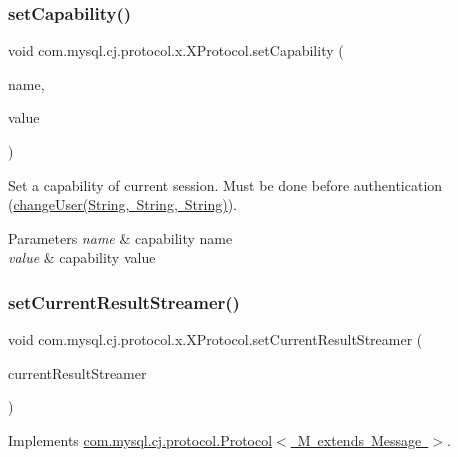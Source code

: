 \subsubsection{\texorpdfstring{set\+Capability()}{setCapability()}}
{\footnotesize\ttfamily void com.\+mysql.\+cj.\+protocol.\+x.\+X\+Protocol.\+set\+Capability (\begin{DoxyParamCaption}\item[{String}]{name,  }\item[{Object}]{value }\end{DoxyParamCaption})}

Set a capability of current session. Must be done before authentication (\mbox{\hyperlink{classcom_1_1mysql_1_1cj_1_1protocol_1_1x_1_1_x_protocol_ada78c49db272f6f4a680c7d552f5be86}{change\+User(\+String, String, String)}}).


\begin{DoxyParams}{Parameters}
{\em name} & capability name \\
\hline
{\em value} & capability value \\
\hline
\end{DoxyParams}
\mbox{\label{classcom_1_1mysql_1_1cj_1_1protocol_1_1x_1_1_x_protocol_a5d594bb0ea3ed519640a02cbdd74a165}} 
\subsubsection{\texorpdfstring{set\+Current\+Result\+Streamer()}{setCurrentResultStreamer()}}
{\footnotesize\ttfamily void com.\+mysql.\+cj.\+protocol.\+x.\+X\+Protocol.\+set\+Current\+Result\+Streamer (\begin{DoxyParamCaption}\item[{\mbox{\hyperlink{interfacecom_1_1mysql_1_1cj_1_1protocol_1_1_result_streamer}{Result\+Streamer}}}]{current\+Result\+Streamer }\end{DoxyParamCaption})}



Implements \mbox{\hyperlink{interfacecom_1_1mysql_1_1cj_1_1protocol_1_1_protocol_a3923a0d582d653fae714775c3ae6db13}{com.\+mysql.\+cj.\+protocol.\+Protocol$<$ M extends Message $>$}}.

